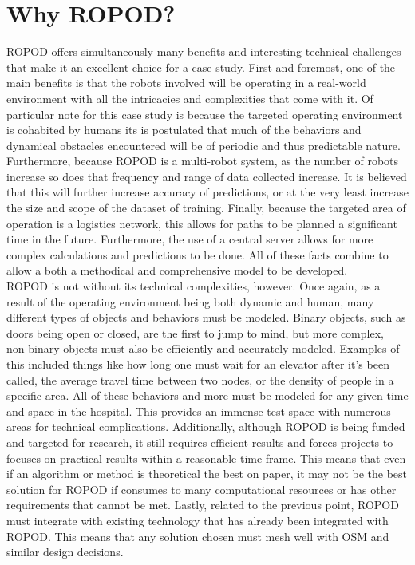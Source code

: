   \section{ Why ROPOD? }
  ROPOD offers simultaneously many benefits and interesting technical
  challenges that make it an excellent choice for a case study. First and
  foremost, one of the main benefits is that the robots involved will be
  operating in a real-world environment with all the intricacies and
  complexities that come with it. Of particular note for this case study is
  because the targeted operating environment is cohabited by humans its is
  postulated that much of the behaviors and dynamical obstacles encountered
  will be of periodic and thus predictable nature. Furthermore, because ROPOD
  is a multi-robot system, as the number of robots increase so does that
  frequency and range of data collected increase. It is believed that this
  will further increase accuracy of predictions, or at the very least increase
  the size and scope of the dataset of training. Finally, because the targeted
  area of operation is a logistics network, this allows for paths to be
  planned a significant time in the future. Furthermore, the use of a central
  server allows for more complex calculations and predictions to be done. All
  of these facts combine to allow a both a methodical and comprehensive model
  to be developed. \\

  ROPOD is not without its technical complexities, however. Once again, as a
  result of the operating environment being both dynamic and human, many
  different types of objects and behaviors must be modeled. Binary objects,
  such as doors being open or closed, are the first to jump to mind, but more
  complex, non-binary objects must also be efficiently and accurately modeled.
  Examples of this included things like how long one must wait for an elevator
  after it's been called, the average travel time between two nodes, or the
  density of people in a specific area. All of these behaviors and more must be
  modeled for any given time and space in the hospital. This provides an immense
  test space with numerous areas for technical complications. Additionally,
  although ROPOD is being funded and targeted for research, it still requires
  efficient results and forces projects to focuses on practical results within
  a reasonable time frame. This means that even if an algorithm or method
  is theoretical the best on paper, it may not be the best solution for ROPOD
  if consumes to many computational resources or has other requirements that
  cannot be met. Lastly, related to the previous point, ROPOD must integrate
  with existing technology that has already been integrated with ROPOD. This
  means that any solution chosen must mesh well with OSM and similar design
  decisions. \\



